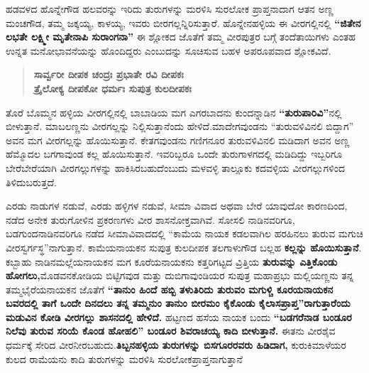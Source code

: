 ಹಡವಳದ ಹೊನ್ನೇಗೌಡ ಹಲವರನ್ನು ಇರಿದು ತುರುಗಳನ್ನು ಮರಳಿಸಿ ಸುರಲೋಕ ಪ್ರಾಪ್ತನಾದಾಗ ಆತನ ಅಣ್ಣ ಮಂಚಗೌಡ, ತಮ್ಮ ಜಕ್ಕಯ್ಯ, ಕಾಳಯ್ಯ, ಇವರು ಬೀರಗಲ್ಲನ್ನಿರಿಸುತ್ತಾರೆ. ಹೊನ್ನೇನಹಳ್ಳಿಯ ಈ ವೀರಗಲ್ಲಿನಲ್ಲಿ \textbf{“ಜಿತೇನ ಲಭತೇ ಲಕ್ಷ್ಮೀ ಮೃತೇನಾಪಿ ಸುರಾಂಗನಾ”} ಈ ಶ್ಲೋಕದ ಜೊತೆಗೆ ತಮ್ಮ ವೀರಪುತ್ರರ ಬಗ್ಗೆ ತಂದೆತಾಯಿಗಳು ಎಂತಹ ಉನ್ನತ ಮನೋಭಾವನೆಯನ್ನು ಹೊಂದಿದ್ದರು ಎಂಬುದನ್ನು ಸೂಚಿಸುವ ಬಹಳ ಅಪರೂಪವಾದ ಶ್ಲೋಕವಿದೆ.

\begin{verse}
\textbf{ಸಾರ್ವ್ವರೀ ದೀಪಕ ಚಂದ್ರಃ ಪ್ರಭಾತೇ ರವಿ ದೀಪಕಃ } \\\textbf{ ತ್ರೈಲೋಕ್ಯ ದೀಪಕೋ ಧರ್ಮಃ ಸುಪುತ್ರ ಕುಲದೀಪಕಃ}
\end{verse}

ತೊರೆ ಬೊಮ್ಮನ ಹಳ್ಳಿಯ ವೀರಗಲ್ಲಿನಲ್ಲಿ ಬಾಬಾಡಿಯ ಮಗ ಎಗರಬಾದನು ಕುಂದನ್ನಾಡಿನ \textbf{“ತುರುಪಾರಿವಿ”}ನಲ್ಲಿ ಬೀಳುತ್ತಾನೆ. ಮಾಬಲಣ್ಣನು ವೀರಗಲ್ಲನ್ನು ನಿಲ್ಲಿಸುತ್ತಾನೆಂದು ಹೇಳಿದೆ.ಮಾದೇಗವುಂಡನು “ತುರುವಳಿವಿನಲಿ ಬಿದ್ದಾಗ” ಅವನ ಮಗ ವೀರಗಲ್ಲನ್ನು ಹೊಯಿಸುತ್ತಾನೆ. ಕೇತಗವುಂಡನು ಗಣಿಗನೂರ ತುರುವಳಿವಿನಲಿ ಮಡಿದಾಗ ಅವನ ಅಣ್ಣ ಹೆಮ್ಮೊದಲ ಬಗಗಾವುಂಡ ಕಲ್ಲ ಹೊಯಿಸುತ್ತಾನೆ. ಇವರಿಬ್ಬರೂ ಒಂದೇ ತುರುಗಾಳಗದಲ್ಲಿ ಮಡಿದಿದ್ದು ಇಬ್ಬರಿಗೂ ಬೇರೆಬೇರೆಯಾಗಿ ವೀರಗಲ್ಲುಗಳನ್ನು ಹಾಕಿಸಿರಬಹುದೆಂಬುದು ಮಳವಳ್ಳಿ ತಾಲ್ಲೂಕು ಕದವಳ್ಳಿಯ ವೀರಗಲ್ಲುಗಳಿಂದ ತಿಳಿದುಬರುತ್ತದೆ.

ಎರಡು ನಾಡುಗಳ ನಡುವೆ, ಎರಡು ಹಳ್ಳಿಗಳ ನಡುವೆ, ಸೀಮಾ ವಿವಾದ ಅಥವಾ ಬೇರೆ ಯಾವುದೋ ಕಾರಣದಿಂದ, ನಡೆದ ಅನೇಕ ತುರುಗೋಳಿನ ಪ್ರಕರಣಗಳು ವೀರ ಶಾಸನೋಕ್ತವಾಗಿವೆ. ಸೋಸಲಿ ನಾಡಿನವರಿಗೂ, ಬಡಗುಂದನಾಡಿನವರಿಗೂ ನಡೆದ ಸೀಮಾವಿವಾದದಲ್ಲಿ “ಕಾಮೆಯ ನಾಯಕ ಕಡಲವಾಗಿಲ ಹರಹಿನಲು ತುರುವ ಮಗುಚಿ ವೀರಸ್ವರ್ಗಸ್ಥ”ನಾಗುತ್ತಾನೆ. ಕಾಮೆಯನಾಯಕನ ಸುಪುತ್ರ ಕುಲದೀಪಕ ತಲಗಾಳುಗೌಡ ಬಲ್ಲಹ \textbf{ಕಲ್ಲನ್ನು ಹೊಯಿಸುತ್ತಾನೆ}. ಕಬ್ಬಾಹು ನಾಡಿನ\break ಮಲ್ಲೆಯನಾಯಕನ ಮಗ ಕೂರೆಯನಾಯಕನು ಕತ್ತರಿಗಟ್ಟದ ವ್ರಿತ್ತಿಯ \textbf{ತುರುವನ್ನು ಎತ್ತಿಕೊಂಡು ಹೋಗಲು,}\break ಮೊಡವನಕೋಡಿಯ ಬಿಟ್ಟಿಗವುಡ ಮತ್ತು ದುಬಿಗಾವುಂಡಿಯರ ಸುಪುತ್ರ ಮಹಾಪ್ರಭು ಮಲ್ಲಿಯಣ್ಣನು ತನ್ನ ತಮ್ಮ\break ಭೈರೆಯನಾಯಕನ ಜೊತೆಗೆ \textbf{“ತಾನುಂ ಹಿಂದೆ ಹಬ್ಬಿ ತಳುತಿರಿದು ತುರುವಂ ಮಗುಳ್ಚಿ ಕೂರಯನಾಯಕನ ಬವರದಲ್ಲಿ ತಾಗೆ ಒಂದೇ ದಿನದಲು ತನ್ನ ತಮ್ಮನುಂ ತಾನುಂ ಬೀರಮಂ ಕೈಕೊಂಡು ಕೈಲಾಸಪ್ರಾಪ್ತ”ರಾಗುತ್ತಾರೆಂದು ಮಡುವಿನ ಕೋಡಿ ವೀರಗಲ್ಲು ಶಾಸನದಲ್ಲಿ ಹೇಳಿದೆ.} ಹಟ್ಟಣದ ಹಸೆಯ ನಾಯಕ ಬಂದು \textbf{“ಬಡಗರೆನಾಡ ಬಂಡೂರ ನಿಲೆವು ತುರುವ ಸರಿಯೆ ಕೊಂಡ ಹೋಹಲಿ” ಬಂಡೂರ ಶಿವರಾಚಯ್ಯ ಕಾದಿ ಬೀಳುತ್ತಾನೆ.} ಈತನು ವೀರಶೈವ ಧರ್ಮಕ್ಕೆ ಸೇರಿದ ವೀರನೀರಬಹುದು.\break \textbf{ತಿಬ್ಬನಹಳ್ಳಿಯ ತುರುಗಳನ್ನು ಬಿಸಗೂರರವರು ಹಿಡಿದಾಗ,} ಕುರುಕಿಮಾಳೆಯರ ಕುಲದ ರಾಮೆಯನು ಕಾದಿ ತುರುಗಳನ್ನು ಮರಳಿಸಿ ಸುರಲೋಕ\-ಪ್ರಾಪ್ತನಾಗುತ್ತಾನೆ

